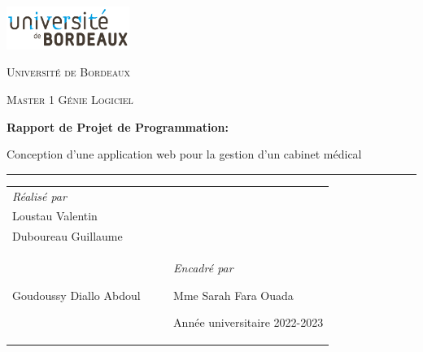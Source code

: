 \documentclass[a4paper]{report}
\begin{document}
\begin{titlepage}
    \centering
    
    \includegraphics[width=0.3\textwidth]{logo/logo_univ_bordeaux.png}\par\vspace{1cm}
    
    {\scshape\LARGE Université de Bordeaux\par}
    \vspace{1cm}
    {\scshape\Large Master 1 Génie Logiciel\par}
    \vspace{3cm}
    {\Large\bfseries Rapport de Projet de Programmation:\par}
    \vspace{1cm}
    {\Huge {Conception d'une application web pour la gestion d'un cabinet médical}\par}

    \vspace{2.5cm}
    \noindent\rule{0.6\textwidth}{0.7pt}
    \vspace{0.5cm}

    \vspace{4cm}
    \begin{tabular}{@{}p{0.5\linewidth}p{0.5\linewidth}@{}}
    \raggedright
    {\large\itshape Réalisé par\par}
    \vspace{0.5cm}
    {\Large Ephrem Jennifer\\Loustau Valentin\\Duboureau Guillaume\\Goudoussy Diallo Abdoul\par}
    &
    \vspace{1cm}
    \raggedleft
    {\large\itshape Encadré par\par}
    {\Large Mme Sarah Fara Ouada\par}
    \vspace{0.5cm}

    {\large Année universitaire 2022-2023\par}
    \end{tabular}
    
\end{titlepage}
\let\cleardoublepage\clearpage
\tableofcontents
\newpage
\listoffigures
\end{document}
